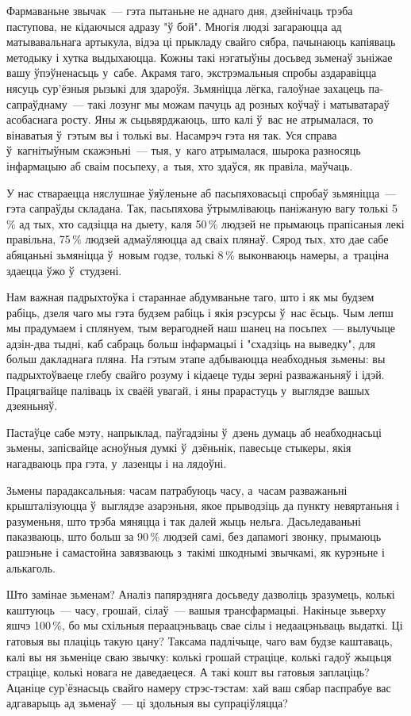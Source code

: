Фармаваньне звычак~--- гэта пытаньне не аднаго дня, дзейнічаць трэба паступова, не кідаючыся адразу "ў бой". Многія людзі загараюцца ад матывавальнага артыкула, відэа ці прыкладу свайго сябра, пачынаюць капіяваць методыку і хутка выдыхаюцца. Кожны такі нэгатыўны досьвед зьменаў зьніжае вашу ўпэўненасьць у~сабе. Акрамя таго, экстрэмальныя спробы аздаравіцца нясуць сур'ёзныя рызыкі для здароўя. Зьмяніцца лёгка, галоўнае захацець па-сапраўднаму~--- такі лозунг мы можам пачуць ад розных коўчаў і матыватараў асобаснага росту. Яны ж сьцьвярджаюць, што калі ў~вас не атрымалася, то вінаватыя ў~гэтым вы і толькі вы. Насамрэч гэта ня так. Уся справа ў~кагнітыўным скажэньні~--- тыя, у~каго атрымалася, шырока разносяць інфармацыю аб сваім посьпеху, а~тыя, хто здаўся, як правіла, маўчаць.

У нас ствараецца няслушнае ўяўленьне аб пасьпяховасьці спробаў зьмяніцца~--- гэта сапраўды складана. Так, пасьпяхова ўтрымліваюць паніжаную вагу толькі 5\,\% ад тых, хто садзіцца на дыету, каля 50\,\% людзей не прымаюць прапісаныя лекі правільна, 75\,\% людзей адмаўляюцца ад сваіх плянаў. Сярод тых, хто дае сабе абяцаньні зьмяніцца ў~новым годзе, толькі 8\,\% выконваюць намеры, а~траціна здаецца ўжо ў~студзені.

Нам важная падрыхтоўка і стараннае абдумваньне таго, што і як мы будзем рабіць, дзеля чаго мы гэта будзем рабіць і якія рэсурсы ў~нас ёсьць. Чым лепш мы прадумаем і сплянуем, тым верагодней наш шанец на посьпех~--- вылучыце адзін-два тыдні, каб сабраць больш інфармацыі і "схадзіць на выведку", для больш дакладнага пляна. На гэтым этапе адбываюцца неабходныя зьмены: вы падрыхтоўваеце глебу свайго розуму і кідаеце туды зерні разважаньняў і ідэй. Працягвайце паліваць іх сваёй увагай, і яны прарастуць у~выглядзе вашых дзеяньняў.

Пастаўце сабе мэту, напрыклад, паўгадзіны ў~дзень думаць аб неабходнасьці зьмены, запісвайце асноўныя думкі ў~дзёньнік, павесьце стыкеры, якія нагадваюць пра гэта, у~лазенцы і на лядоўні.

Зьмены парадаксальныя: часам патрабуюць часу, а~часам разважаньні крышталізуюцца ў~выглядзе азарэньня, якое прыводзіць да пункту невяртаньня і разуменьня, што трэба мяняцца і так далей жыць нельга. Дасьледаваньні паказваюць, што больш за 90\,\% людзей самі, без дапамогі звонку, прымаюць рашэньне і самастойна завязваюць з~такімі шкоднымі звычкамі, як курэньне і алькаголь. 

Што замінае зьменам? Аналіз папярэдняга досьведу дазволіць зразумець, колькі каштуюць~--- часу, грошай, сілаў~--- вашыя трансфармацыі. Накіньце зьверху яшчэ 100\,\%, бо мы схільныя пераацэньваць свае сілы і недаацэньваць выдаткі. Ці гатовыя вы плаціць такую цану? Таксама падлічыце, чаго вам будзе каштаваць, калі вы ня зьменіце сваю звычку: колькі грошай страціце, колькі гадоў жыцьця страціце, колькі новага не даведаецеся. А такі кошт вы гатовыя заплаціць? Ацаніце сур'ёзнасьць свайго намеру стрэс-тэстам: хай ваш сябар паспрабуе вас адгаварыць ад зьменаў~--- ці здольныя вы супраціўляцца? 

